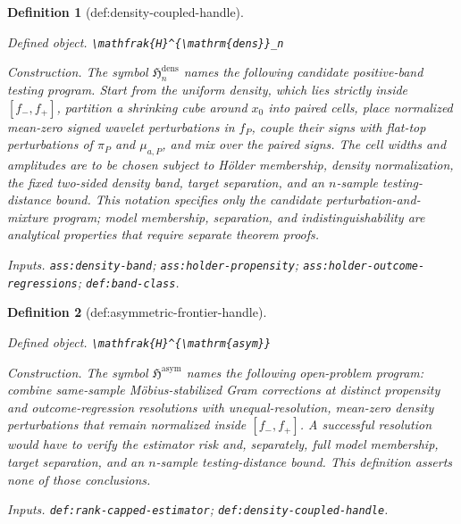 \documentclass{article}
\newtheorem{definition}{Definition}
\begin{document}
\begin{definition}[def:density-coupled-handle]\label{def:density-coupled-handle}
\par\smallskip\noindent\emph{Defined object.} \texttt{\textbackslash{}\allowbreak{}mathfrak\{H\}\allowbreak{}\textasciicircum{}\{\textbackslash{}\allowbreak{}mathrm\{dens\}\allowbreak{}\}\allowbreak{}\_\allowbreak{}n}
\par\smallskip\noindent\emph{Construction.} The symbol \(\mathfrak H_n^{\mathrm{dens}}\) names the following candidate
positive-band testing program.  Start from the uniform density, which lies
strictly inside \([f_{-},f_{+}]\), partition a shrinking cube around \(x_0\)
into paired cells, place normalized mean-zero signed wavelet perturbations in
\(f_P\), couple their signs with flat-top perturbations of \(\pi_P\) and
\(\mu_{a,P}\), and mix over the paired signs.  The cell widths and amplitudes
are to be chosen subject to H\"older membership, density normalization, the
fixed two-sided density band, target separation, and an \(n\)-sample testing-distance
bound.  This notation specifies only the candidate perturbation-and-mixture
program; model membership, separation, and indistinguishability are analytical
properties that require separate theorem proofs.
\par\smallskip\noindent\emph{Inputs.} \texttt{ass:\allowbreak{}density-\allowbreak{}band}; \texttt{ass:\allowbreak{}holder-\allowbreak{}propensity}; \texttt{ass:\allowbreak{}holder-\allowbreak{}outcome-\allowbreak{}regressions}; \texttt{def:\allowbreak{}band-\allowbreak{}class}.
\end{definition}

\begin{definition}[def:asymmetric-frontier-handle]\label{def:asymmetric-frontier-handle}
\par\smallskip\noindent\emph{Defined object.} \texttt{\textbackslash{}\allowbreak{}mathfrak\{H\}\allowbreak{}\textasciicircum{}\{\textbackslash{}\allowbreak{}mathrm\{asym\}\allowbreak{}\}\allowbreak{}}
\par\smallskip\noindent\emph{Construction.} The symbol \(\mathfrak H^{\mathrm{asym}}\) names the following open-problem program: combine same-sample M\"obius-stabilized Gram corrections at distinct propensity and outcome-regression resolutions with unequal-resolution, mean-zero density perturbations that remain normalized inside \([f_{-},f_{+}]\).  A successful resolution would have to verify the estimator risk and, separately, full model membership, target separation, and an \(n\)-sample testing-distance bound.  This definition asserts none of those conclusions.
\par\smallskip\noindent\emph{Inputs.} \texttt{def:\allowbreak{}rank-\allowbreak{}capped-\allowbreak{}estimator}; \texttt{def:\allowbreak{}density-\allowbreak{}coupled-\allowbreak{}handle}.
\end{definition}
\end{document}
